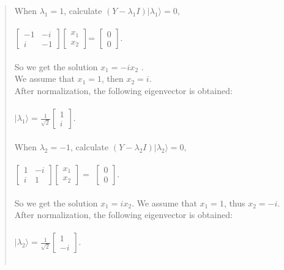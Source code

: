 \documentclass[UTF8]{ctexart}
\begin{document}
\begin{quote}
	When $\lambda_{1}=1$, calculate
    	$(Y-\lambda_{1} I)|\lambda_{1}\rangle=0$, \\  \\
	$\begin{bmatrix}-1&-i\\i&-1\end{bmatrix}\begin{bmatrix}x_{1}\\x_{2}\end{bmatrix}$=
	$\begin{bmatrix}0\\0\end{bmatrix}$. \\  \\ 
	So we get the solution $x_{1}=-ix_{2}$ .\\
	We  assume that $x_{1}=1$, then $x_{2}=i$.  \\ 
	After normalization, the following eigenvector is obtained:\\  \\
	$|\lambda_{1}\rangle=\frac{1}{\sqrt{2}}\begin{bmatrix}1\\i\end{bmatrix}.$ 
	\\  \\
	When $\lambda_{2}=-1$, calculate
    	$(Y-\lambda_{2} I)|\lambda_{2}\rangle=0,$ \\  \\
	$\begin{bmatrix}1&-i\\i&1\end{bmatrix}\begin{bmatrix}x_{1}\\x_{2}\end{bmatrix}=$
	$\begin{bmatrix}0\\0\end{bmatrix}$. \\  \\
	So we get the solution $x_{1}=ix_{2}$.
	We  assume that $x_{1}=1$, thus $x_{2}=-i$.\\
	After normalization, the following eigenvector is obtained:\\  \\
	$|\lambda_{2}\rangle=\frac{1}{\sqrt{2}}\begin{bmatrix}1\\-i\end{bmatrix}.$ \\  \\

\end{quote}
\end{document}
